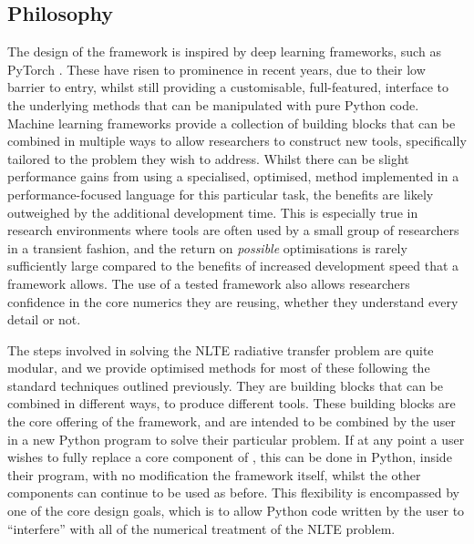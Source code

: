 \subsection{Philosophy}

The design of the \Lw{} framework is inspired by deep learning frameworks, such as PyTorch \citep{PyTorch}.
These have risen to prominence in recent years, due to their low barrier to entry, whilst still providing a customisable, full-featured, interface to the underlying methods that can be manipulated with pure Python code.
Machine learning frameworks provide a collection of building blocks that can be combined in multiple ways to allow researchers to construct new tools, specifically tailored to the problem they wish to address.
Whilst there can be slight performance gains from using a specialised, optimised, \Sota{} method implemented in a performance-focused language for this particular task, the benefits are likely outweighed by the additional development time.
This is especially true in research environments where tools are often used by a small group of researchers in a transient fashion, and the return on \emph{possible} optimisations is rarely sufficiently large compared to the benefits of increased development speed that a framework allows.
The use of a tested framework also allows researchers confidence in the core numerics they are reusing, whether they understand every detail or not.

The steps involved in solving the NLTE radiative transfer problem are quite modular, and we provide optimised methods for most of these following the standard techniques outlined previously.
They are building blocks that can be combined in different ways, to produce different tools.
These building blocks are the core offering of the \Lw{} framework, and are intended to be combined by the user in a new Python program to solve their particular problem.
If at any point a user wishes to fully replace a core component of \Lw{}, this can be done in Python, inside their program, with no modification the framework itself, whilst the other components can continue to be used as before.
This flexibility is encompassed by one of the core design goals, which is to allow Python code written by the user to ``interfere'' with all of the numerical treatment of the NLTE problem.

